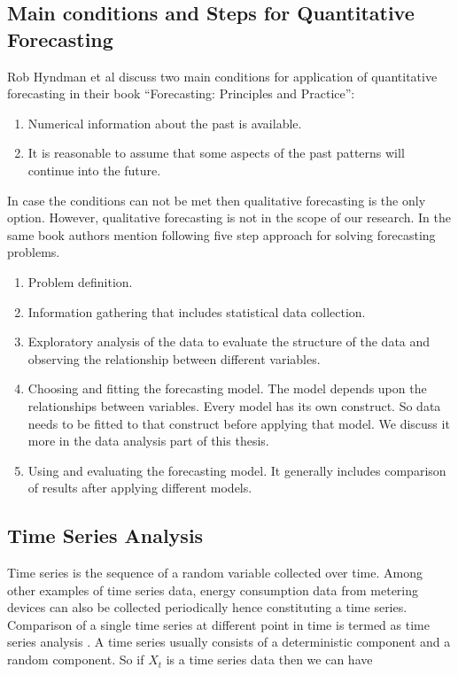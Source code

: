 \subsection{Main conditions and Steps for Quantitative Forecasting}\label{conditions}
Rob Hyndman et al \cite{hyndman2014forecasting} discuss two main conditions for application of quantitative forecasting in their book ``Forecasting: Principles and Practice'':
\begin{enumerate}
\item Numerical information about the past is available.
\item It is reasonable to assume that some aspects of the past patterns will continue into the future.
\end{enumerate}
In case the conditions can not be met then qualitative forecasting is the only option. However, qualitative forecasting is not in the scope of our research. In the same book authors mention following five step approach for solving forecasting problems.
\begin{enumerate}
\item Problem definition.
\item Information gathering that includes statistical data collection.
\item Exploratory analysis of the data to evaluate the structure of the data and observing the relationship between different variables.
\item Choosing and fitting the forecasting model. The model depends upon the relationships between variables. Every model has its own construct. So data needs to be fitted to that construct before applying that model. We discuss it more in the data analysis part of this thesis.
\item Using and evaluating the forecasting model. It generally includes comparison of results after applying different models.  
\end{enumerate}    

\subsection{Time Series Analysis}
Time series is the sequence of a random variable collected over time. Among other examples of time series data, energy consumption data from metering devices can also be collected periodically hence constituting a time series. Comparison of a single time series at different point in time is termed as time series analysis \cite{box1976time}. A time series usually consists of a deterministic component and a random component\cite{mujumdarstochastic}. So if \(X_{t}\) is a time series data then we can have 


